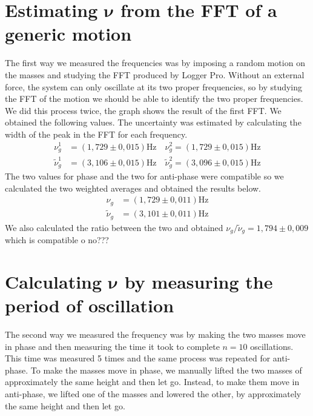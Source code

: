\documentclass{article}
\begin{document}
\section{Estimating $\bm \nu$ from the FFT of a generic motion}
The first way we measured the frequencies was by imposing a random motion on the masses and studying the FFT produced by Logger Pro. Without an external force, the system can only oscillate at its two proper frequencies, so by studying the FFT of the motion we should be able to identify the two proper frequencies. We did this process twice, the graph shows the result of the first FFT. 
We obtained the following values. The uncertainty was estimated by calculating the width of the peak in the FFT for each frequency.
\begin{align}
           \nu_g^1 &= (1,729 \pm 0,015) \text{Hz} \quad        \nu_g^2 = (1,729 \pm 0,015) \text{Hz} \\
    \tilde \nu_g^1 &= (3,106 \pm 0,015) \text{Hz} \quad \tilde \nu_g^2 = (3,096 \pm 0,015) \text{Hz}
\end{align}
The two values for phase and the two for anti-phase were compatible so we calculated the two weighted averages and obtained the results below.
\begin{align}
           \nu_g &= (1,729 \pm 0,011) \text{Hz}\\
    \tilde \nu_g &= (3,101 \pm 0,011) \text{Hz}
\end{align}
We also calculated the ratio between the two and obtained $ \nu_g / \tilde \nu_g = 1,794 \pm 0,009$ which is compatible o no???


\section{Calculating $\bm \nu$ by measuring the period of oscillation}

The second way we measured the frequency was by making the two masses move in phase and then measuring the time it took to complete $n=10$ oscillations. This time was measured 5 times and the same process was repeated for anti-phase. To make the masses move in phase, we manually lifted the two masses of approximately the same height and then let go. Instead, to make them move in anti-phase, we lifted one of the masses and lowered the other, by approximately the same height and then let go.
\end{document}
